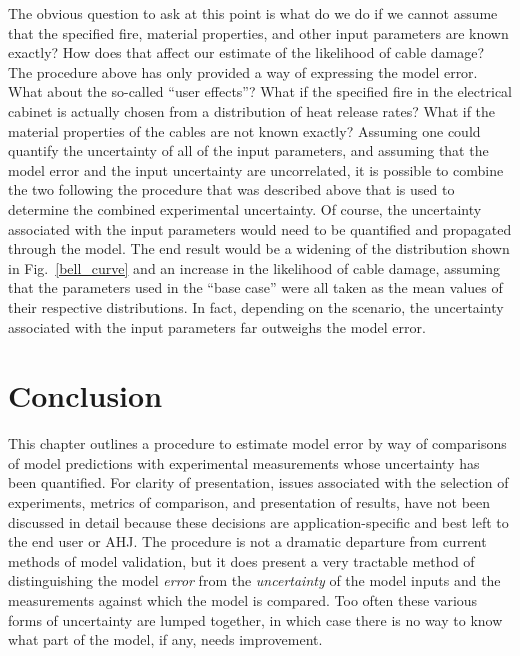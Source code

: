 The obvious question to ask at this point is what do we do if we cannot assume that the specified fire, material properties, and other input parameters are
known exactly? How does that affect our estimate of the likelihood of cable damage? The procedure above has only provided a way of expressing the model
error. What about the so-called ``user effects''? What if the specified fire in the electrical cabinet is actually chosen from a distribution of heat release rates?
What if the material properties of the cables are not known exactly? Assuming one could quantify the uncertainty of all of the input parameters, and assuming that the model error
and the input uncertainty are uncorrelated, it is possible to combine the two following the procedure that was described above that is used to determine the combined 
experimental uncertainty. Of
course, the uncertainty associated with the input parameters would need to be quantified and propagated through the model. The end result would be a widening of
the distribution shown in Fig.~\ref{bell_curve} and an increase in the likelihood of cable damage, assuming that the parameters used in the ``base case'' were
all taken as the mean values of their respective distributions. In fact, depending on the scenario, the uncertainty associated with the input parameters far outweighs
the model error.


\section{Conclusion}

This chapter outlines a procedure to estimate model error by way of comparisons of model predictions with experimental measurements whose uncertainty has been
quantified. For clarity of presentation, issues associated with the selection of experiments, metrics of comparison, and presentation of results, have not been
discussed in detail because these decisions are application-specific and best left to the end user or AHJ. The procedure is not a dramatic departure from current
methods of model validation, but it does present a very tractable method of distinguishing the model {\em error} from the {\em uncertainty} of the model inputs and the measurements
against which the model is compared. Too often these various forms of uncertainty are lumped together, in which case there is no way to know what part of the model, if
any, needs improvement.
